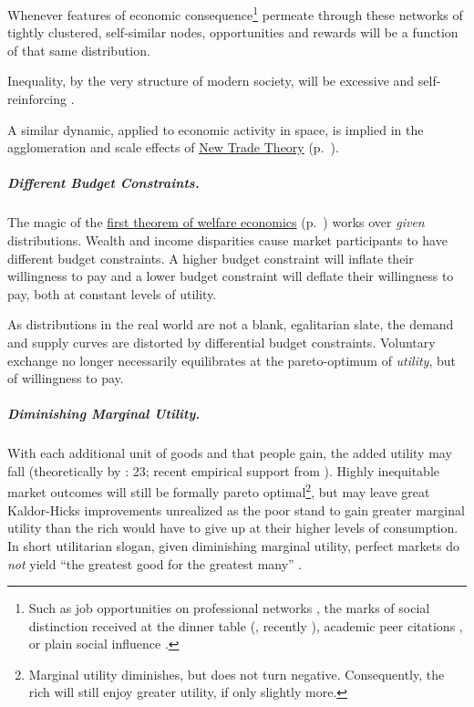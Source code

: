 \begin{enumerate}
	Whenever features of economic consequence\footnote{
		Such as job opportunities on professional networks \citep{Benkler2006}, the marks of social distinction received at the dinner table (\citealt{Bourdieu-1984-aa}, recently \citealt{Hartmann2002}), academic peer citations \citep{Jackson1968, Merton1988}, or plain social influence \citep{Asch}.} 
	permeate through these networks of tightly clustered, self-similar nodes, opportunities and rewards will be a function of that same distribution. 
	
	Inequality, by the very structure of modern society, will be excessive and self-reinforcing \citep{Cozzi2009,Keller2005,Andriani2007}.	
	
	A similar dynamic, applied to economic activity in space, is implied in the agglomeration and scale effects of \hyperref[sec:NTT]{New Trade Theory} (p.~\pageref{sec:NTT}).
\end{enumerate}

\subparagraph{Different Budget Constraints.}  \label{sec:differentbudgetconstraints} The magic of the \hyperref[fn:1sttheorem]{first theorem of welfare economics} (p.~\pageref{fn:1sttheorem}) works over \emph{given} distributions. Wealth and income disparities cause market participants to have different budget constraints. A higher budget constraint will inflate their willingness to pay and a lower budget constraint will deflate their willingness to pay, both at constant levels of utility. 


As distributions in the real world are not a blank, egalitarian slate, the demand and supply curves are distorted by differential budget constraints. Voluntary exchange no longer necessarily equilibrates at the pareto-optimum of \emph{utility}, but of willingness to pay.

\subparagraph{Diminishing Marginal Utility.} \label{sec:diminishingmarginalutility} With each additional unit of goods and  that people gain, the added utility may fall (theoretically by \citealt{Lerner1944}: 23; recent empirical support from \citealt{Ng-1997-aa,Veenhoven-2000-aa,Nickell2008}). Highly inequitable market outcomes will still be formally pareto optimal\footnote{
	Marginal utility diminishes, but does not turn negative. Consequently, the rich will still enjoy greater utility, if only slightly more.}, 
but may leave great Kaldor-Hicks improvements unrealized as the poor stand to gain greater marginal utility than the rich would have to give up at their higher levels of consumption. In short utilitarian slogan, given diminishing marginal utility, perfect markets do \emph{not} yield ``the greatest good for the greatest many'' \citep{Mill1863}.

